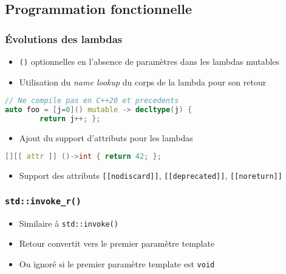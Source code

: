 \documentclass[C++.tex]{subfiles}
\begin{document}
\subsection*{Programmation fonctionnelle}
\begin{frame}[fragile]
	\frametitle{Évolutions des lambdas}
	\begin{itemize}
		\item \lstinline|()| optionnelles en l'absence de paramètres dans les lambdas mutables


		\item Utilisation du \textit{name lookup} du corps de la lambda pour son retour
	\end{itemize}

	\begin{lstlisting}[language=C++]
// Ne compile pas en C++20 et precedents
auto foo = [j=0]() mutable -> decltype(j) {
		return j++; };\end{lstlisting}


	\begin{itemize}
		\item Ajout du support d'attributs pour les lambdas
	\end{itemize}

	\begin{lstlisting}[language=C++]
[][[ attr ]] ()->int { return 42; };\end{lstlisting}

	\begin{itemize}
		\item Support des attributs \lstinline|[[nodiscard]]|, \lstinline|[[deprecated]]|, \lstinline|[[noreturn]]|
	\end{itemize}
\end{frame}

\begin{frame}[fragile]
	\frametitle{\lstinline|std::invoke_r()|}
	\begin{itemize}
		\item Similaire à \lstinline|std::invoke()|
		\item Retour convertit vers le premier paramètre template
		\item Ou ignoré si le premier paramètre template est \lstinline|void|
	\end{itemize}
\end{frame}
\end{document}
